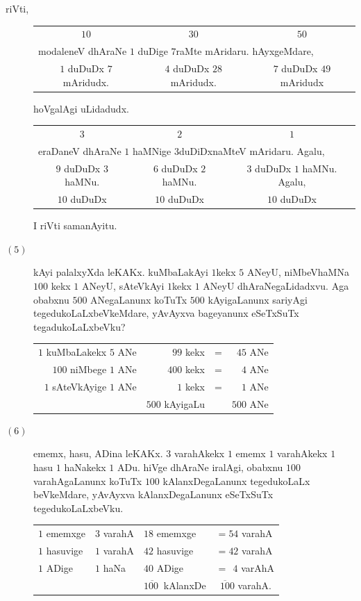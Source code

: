 \begin{description}
\item[riVti,]

  \begin{tabular}[t]{ccc}
    $10$ & $30$ & $50$\\
    \multicolumn{3}{l}{modaleneV dhAraNe $1$ duDige $7$raMte
      mAridaru. hAyxgeMdare,}\\
    $1$ duDuDx $7$ mAridudx. & $4$ duDuDx $28$ mAridudx. & $7$ duDuDx
    $49$ mAridudx
  \end{tabular}

  hoVgalAgi uLidadudx.

  \begin{tabular}[t]{ccc}
    $3$ & $2$ & $1$\\
    \multicolumn{3}{l}{eraDaneV dhAraNe $1$ haMNige $3$duDiDxnaMteV
      mAridaru. Agalu,}\\
    $9$ duDuDx $3$ haMNu. & $6$ duDuDx $2$ haMNu. & $3$ duDuDx
    $1$ haMNu. Agalu,\\
    $10$ duDuDx & $10$ duDuDx & $10$ duDuDx 
  \end{tabular}

  I riVti samanAyitu.
\item[$(5)$] kAyi palalxyXda leKAKx. kuMbaLakAyi $1$kekx $5$ ANeyU,
  niMbeVhaMNa $100$ kekx $1$ ANeyU, sAteVkAyi $1$kekx $1$ ANeyU
  dhAraNegaLidadxvu. Aga obabxnu $500$ ANegaLanunx koTuTx $500$
  kAyigaLanunx sariyAgi tegedukoLaLxbeVkeMdare, yAvAyxva bageyanunx
  eSeTxSuTx tegadukoLaLxbeVku?
  
  \begin{tabular}{rrcr}
    $1$ kuMbaLakekx $5$ ANe & $99$ kekx & = & $45$ ANe\\
    $100$ niMbege $1$ ANe & $400$ kekx & = & $4$ ANe\\
    $1$ sAteVkAyige $1$ ANe & $1$ kekx & = & $1$ ANe\\
    \cline{2-4}
    & $500$ kAyigaLu & & $500$ ANe\\
    \cline{2-4}
  \end{tabular}

\item[$(6)$] ememx, hasu, ADina leKAKx. $3$ varahAkekx $1$ ememx $1$
  varahAkekx $1$ hasu $1$ haNakekx $1$ ADu. hiVge dhAraNe iralAgi,
  obabxnu $100$ varahAgaLanunx koTuTx $100$
 kAlanxDegaLanunx tegedukoLaLx beVkeMdare, yAvAyxva kAlanxDegaLanunx
 eSeTxSuTx tegedukoLaLxbeVku.

  \begin{tabular}{llll}
    $1$ ememxge & $3$ varahA & $18$ ememxge & $= 54$ varahA\\
    $1$ hasuvige & $1$ varahA & $42$ hasuvige & $= 42$ varahA\\
    $1$ ADige & $1$ haNa & $40$ ADige & $= ~~4$ varAhA\\
    & & $\overline{100~}$ kAlanxDe & $\overline{~~100}$ varahA.
  \end{tabular}


\end{description}
